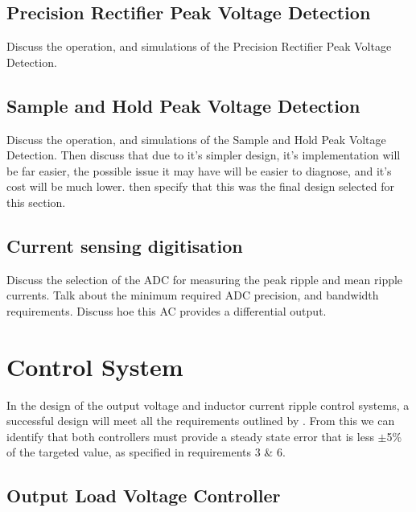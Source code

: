 \subsection*{Precision Rectifier Peak Voltage Detection}\label{S:current_sense_precision_rectifier_design}

Discuss the operation, and simulations of the Precision Rectifier Peak Voltage Detection. 

\subsection*{Sample and Hold Peak Voltage Detection}\label{S:current_sense_sample_and_hold_design}

Discuss the operation, and simulations of the Sample and Hold Peak Voltage Detection. Then discuss that due to it's simpler design, it's implementation will be far easier, the possible issue it may have will be easier to diagnose, and it's cost will be much lower. then specify that this was the final design selected for this section.

\subsection*{Current sensing digitisation}\label{S:current_sense_ADC_design}

Discuss the selection of the ADC for measuring the peak ripple and mean ripple currents. Talk about the minimum required ADC precision, and bandwidth requirements. Discuss hoe this AC provides a differential output. 


%
%

\section{Control System}\label{S:control_design}

In the design of the output voltage and inductor current ripple control systems, a successful design will meet all the requirements outlined by . From this we can identify that both controllers must provide a steady state error that is less $\pm$5\% of the targeted value, as specified in requirements 3 \& 6. 

\subsection{Output Load Voltage Controller}\label{S:output_control_design}

